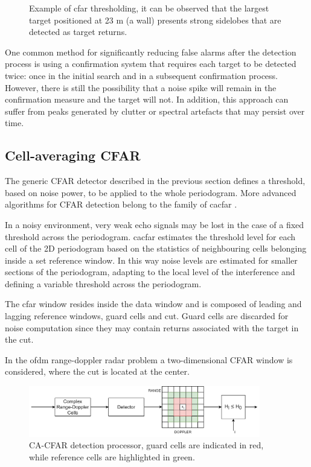 \begin{figure}[H]
				\caption[]{Example of \gls{cfar} thresholding, it can be observed that the largest target positioned at 23 m (a wall) presents strong sidelobes that are detected as target returns.}
				\label{fig:RadThesh_CFAR_abv_thresh_doubl}
			\end{figure}
			
			
			One common method for significantly reducing false alarms after the detection process is using a confirmation system that requires each target to be detected twice: once in the initial search and in a subsequent confirmation process.
			However, there is still the possibility that a noise spike will remain in the confirmation measure and the target will not. In addition, this approach can suffer from peaks generated by clutter or spectral artefacts that may persist over time.

		\subsection{Cell-averaging CFAR}
		\label{sec:cell averaging CFAR}

The generic CFAR detector described in the previous section defines a threshold, based on noise power, to be applied to the whole periodogram. More advanced algorithms for CFAR detection belong to the family of \gls{cacfar} \cite{Richards_2014}.

In a noisy environment, very weak echo signals may be lost in the case of a fixed threshold across the periodogram. \gls{cacfar} estimates the threshold level for each cell of the 2D periodogram based on the statistics of neighbouring cells belonging inside a set reference window. In this way noise levels are estimated for smaller sections of the periodogram, adapting to the local level of the interference and defining a variable threshold across the periodogram.

The \gls{cfar} window resides inside the data window and is composed of leading and lagging reference windows, guard cells and \gls{cut}. Guard cells are discarded for noise computation since they may contain returns associated with the target in the \gls{cut}.

In the \gls{ofdm} range-doppler radar problem a two-dimensional CFAR window is considered, where the \gls{cut} is located at the center.

\begin{figure}[H]
	\centering
	\includegraphics[width=0.9\textwidth]{Images/radar_detect_threshold/cacfar_pipeline.png}
	\caption{CA-CFAR detection processor, guard cells are indicated in red, while reference cells are highlighted in green.}
	\label{fig:cacfar_pipeline}
\end{figure}


